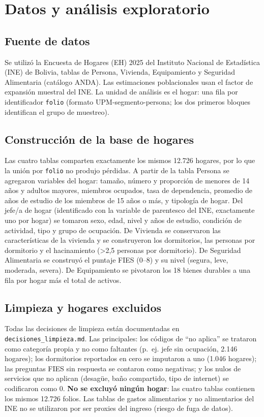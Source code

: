 \section{Datos y análisis exploratorio}
\subsection{Fuente de datos}
Se utilizó la Encuesta de Hogares (EH) 2025 del Instituto Nacional de Estadística (INE) de Bolivia, tablas de Persona, Vivienda, Equipamiento y Seguridad Alimentaria (catálogo ANDA). Las estimaciones poblacionales usan el factor de expansión muestral del INE. La unidad de análisis es el hogar: una fila por identificador \texttt{folio} (formato UPM-segmento-persona; los dos primeros bloques identifican el grupo de muestreo).

\subsection{Construcción de la base de hogares}
Las cuatro tablas comparten exactamente los mismos 12.726 hogares, por lo que la unión por \texttt{folio} no produjo pérdidas. A partir de la tabla Persona se agregaron variables del hogar: tamaño, número y proporción de menores de 14 años y adultos mayores, miembros ocupados, tasa de dependencia, promedio de años de estudio de los miembros de 15 años o más, y tipología de hogar. Del jefe/a de hogar (identificado con la variable de parentesco del INE, exactamente uno por hogar) se tomaron sexo, edad, nivel y años de estudio, condición de actividad, tipo y grupo de ocupación. De Vivienda se conservaron las características de la vivienda y se construyeron los dormitorios, las personas por dormitorio y el hacinamiento (>2,5 personas por dormitorio). De Seguridad Alimentaria se construyó el puntaje FIES (0--8) y su nivel (segura, leve, moderada, severa). De Equipamiento se pivotaron los 18 bienes durables a una fila por hogar más el total de activos.

\subsection{Limpieza y hogares excluidos}
Todas las decisiones de limpieza están documentadas en \texttt{decisiones\_limpieza.md}. Las principales: los códigos de ``no aplica'' se trataron como categoría propia y no como faltantes (p.~ej. jefe sin ocupación, 2.146 hogares); los dormitorios reportados en cero se imputaron a uno (1.046 hogares); las preguntas FIES sin respuesta se contaron como negativas; y los nulos de servicios que no aplican (desagüe, baño compartido, tipo de internet) se codificaron como 0. \textbf{No se excluyó ningún hogar}: las cuatro tablas contienen los mismos 12.726 folios. Las tablas de gastos alimentarios y no alimentarios del INE no se utilizaron por ser proxies del ingreso (riesgo de fuga de datos).


